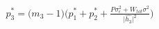 \documentclass[preview]{standalone}
\begin{document}
\begin{align*}
p_3^\ast = \big(m_3 - 1\big) ( p_1^\ast + p_2^\ast + \frac{P \sigma_\epsilon^2 + W_{tot} \sigma^2}{\big|\hat{h_3}\big|^2}\big)
\end{align*}
\end{document}
